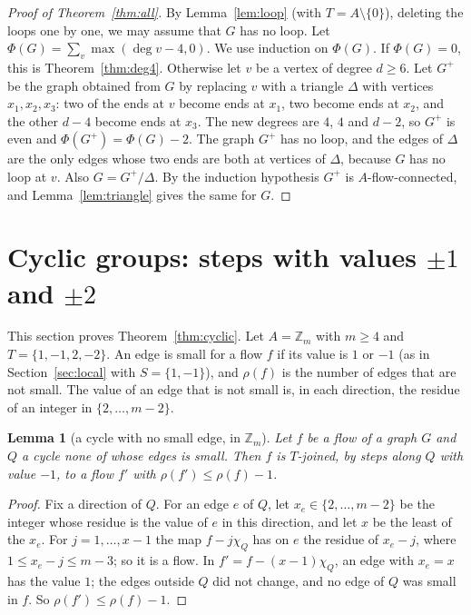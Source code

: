 \documentclass[11pt]{article}
\newtheorem{lemma}[theorem]{Lemma}
\theoremstyle{definition}
\newcommand{\Z}{\mathbb{Z}}
\begin{document}
\begin{proof}[Proof of Theorem~\ref{thm:all}]
By Lemma~\ref{lem:loop} (with $T=A\setminus\{0\}$), deleting the loops one by one, we may assume that $G$ has no loop. Let
$\Phi(G)=\sum_v\max(\deg v-4,0)$. We use induction on $\Phi(G)$. If $\Phi(G)=0$, this is Theorem~\ref{thm:deg4}.
Otherwise let $v$ be a vertex of degree $d\ge 6$. Let $G^+$ be the graph obtained from $G$ by replacing $v$ with a
triangle $\Delta$ with vertices $x_1,x_2,x_3$: two of the ends at $v$ become ends at $x_1$, two become ends at $x_2$,
and the other $d-4$ become ends at $x_3$. The new degrees are $4$, $4$ and $d-2$, so $G^+$ is even and
$\Phi(G^+)=\Phi(G)-2$. The graph $G^+$ has no loop, and the edges of $\Delta$ are the only edges whose two ends
are both at vertices of $\Delta$, because $G$ has no loop at $v$. Also $G=G^+/\Delta$. By the induction hypothesis $G^+$ is
$A$-flow-connected, and Lemma~\ref{lem:triangle} gives the same for $G$.
\end{proof}

\section{Cyclic groups: steps with values \texorpdfstring{$\pm1$}{+-1} and \texorpdfstring{$\pm2$}{+-2}}\label{sec:cyclic}

This section proves Theorem~\ref{thm:cyclic}. Let $A=\Z_m$ with $m\ge 4$ and $T=\{1,-1,2,-2\}$. An edge is small for a flow $f$ if its value is $1$
or $-1$ (as in Section~\ref{sec:local} with $S=\{1,-1\}$), and $\rho(f)$ is the number of edges that are not small. The value of an edge that is not
small is, in each direction, the residue of an integer in $\{2,\dots,m-2\}$.

\begin{lemma}[a cycle with no small edge, in $\Z_m$]\label{lem:Acyc}
Let $f$ be a flow of a graph $G$ and $Q$ a cycle none of whose edges is small. Then $f$ is $T$-joined, by steps along
$Q$ with value $-1$, to a flow $f'$ with $\rho(f')\le\rho(f)-1$.
\end{lemma}
\begin{proof}
Fix a direction of $Q$. For an edge $e$ of $Q$, let $x_e\in\{2,\dots,m-2\}$ be the integer whose residue is the value
of $e$ in this direction, and let $x$ be the least of the $x_e$. For $j=1,\dots,x-1$ the map $f-j\chi_Q$ has on $e$
the residue of $x_e-j$, where $1\le x_e-j\le m-3$; so it is a flow. In $f'=f-(x-1)\chi_Q$, an edge with $x_e=x$
has the value $1$; the edges outside $Q$ did not change, and no edge of $Q$ was small in $f$. So $\rho(f')\le\rho(f)-1$.
\end{proof}
\end{document}
